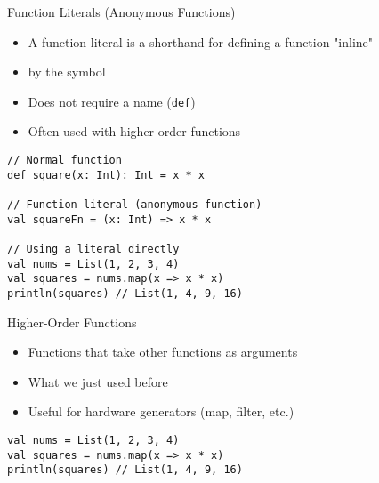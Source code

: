 \begin{frame}[fragile]{Function Literals (Anonymous Functions)}
\begin{itemize}
    \item A function literal is a shorthand for defining a function "inline"
    \item by the \code{=>} symbol
    \item Does not require a name (\texttt{def})
    \item Often used with higher-order functions
\end{itemize}

\begin{verbatim}
// Normal function
def square(x: Int): Int = x * x

// Function literal (anonymous function)
val squareFn = (x: Int) => x * x

// Using a literal directly
val nums = List(1, 2, 3, 4)
val squares = nums.map(x => x * x)
println(squares) // List(1, 4, 9, 16)
\end{verbatim}
\end{frame}

\begin{frame}[fragile]{Higher-Order Functions}
\begin{itemize}
    \item Functions that take other functions as arguments
    \item What we just used before
    \item Useful for hardware generators (map, filter, etc.)
\end{itemize}

\begin{verbatim}
val nums = List(1, 2, 3, 4)
val squares = nums.map(x => x * x)
println(squares) // List(1, 4, 9, 16)
\end{verbatim}

%
\end{frame}

